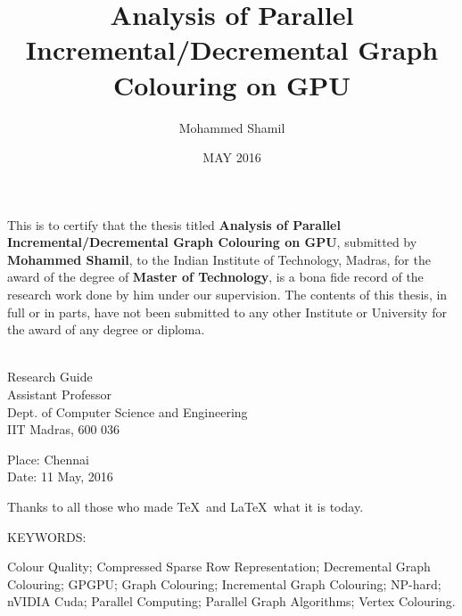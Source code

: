 \documentclass[MTech]{iitmdiss}
\def\thesistitle{Analysis of Parallel Incremental/Decremental Graph Colouring on GPU}
\def\thesisauthor{Mohammed Shamil}
\begin{document}

\title{\thesistitle}

\author{\thesisauthor}

\date{MAY 2016}

\maketitle

\certificate

\vspace*{0.5in}

\noindent This is to certify that the thesis titled {\bf {\thesistitle}}, submitted by {\bf {\thesisauthor}}, 
  to the Indian Institute of Technology, Madras, for
the award of the degree of {\bf Master of Technology}, is a bona fide
record of the research work done by him under our supervision.  The
contents of this thesis, in full or in parts, have not been submitted
to any other Institute or University for the award of any degree or
diploma.

\vspace*{1.5in}
\hspace*{-0.25in}
\begin{singlespace}
 \\
\noindent Research Guide \\ 
\noindent Assistant Professor \\
\noindent Dept. of Computer Science and Engineering\\
\noindent IIT Madras, 600 036 \\
\end{singlespace}
\vspace*{0.25in}
\noindent Place: Chennai\\ 
Date: 11 May, 2016


\acknowledgements

Thanks to all those who made \TeX\ and \LaTeX\ what it is today.


\abstract

\noindent KEYWORDS: \hspace*{0.5em} \parbox[t]{4.4in}{Colour Quality; Compressed Sparse Row Representation; Decremental Graph Colouring; GPGPU; Graph Colouring; Incremental Graph Colouring; NP-hard; nVIDIA Cuda; Parallel Computing; Parallel Graph Algorithms; Vertex Colouring.}
\end{document}
